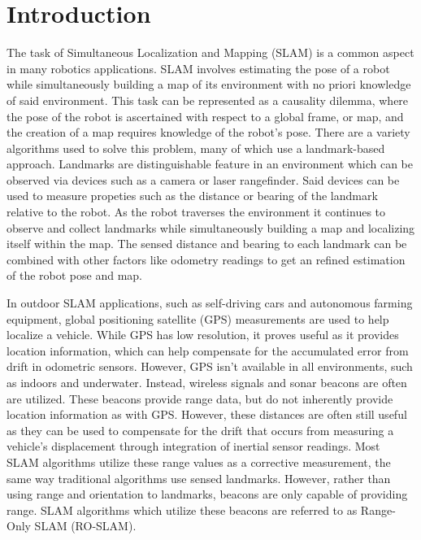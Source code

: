 \documentclass[conference]{IEEEtran}
\begin{document}
	\section{Introduction} 
	
		The task of Simultaneous Localization and Mapping (SLAM) is a common aspect in many robotics applications. SLAM involves estimating the pose of a robot while simultaneously building a map of its environment with no priori knowledge of said environment. This task can be represented as a causality dilemma, where the pose of the robot is ascertained with respect to a global frame, or map, and the creation of a map requires knowledge of the robot's pose. There are a variety algorithms used to solve this problem, many of which use a landmark-based approach. Landmarks are distinguishable feature in an environment which can be observed via devices such as a camera or laser rangefinder. Said devices can be used to measure propeties such as the distance or bearing of the landmark relative to the robot. As the robot traverses the environment it continues to observe and collect landmarks while simultaneously building a map and localizing itself within the map. The sensed distance and bearing to each landmark can be combined with other factors like odometry readings to get an refined estimation of the robot pose and map. 
		

		In outdoor SLAM applications, such as self-driving cars and autonomous farming equipment, global positioning satellite (GPS) measurements are used to help localize a vehicle. %
		While GPS has low resolution, it proves useful as it provides location information, which can help compensate for the accumulated error from drift in odometric sensors. However, GPS isn't available in all environments, such as indoors and underwater. Instead, wireless signals and sonar beacons are often are utilized. These beacons provide range data, but do not inherently provide location information as with GPS. However, these distances are often still useful as they can be used to compensate for the drift that occurs from measuring a vehicle's displacement through integration of inertial sensor readings. Most SLAM algorithms utilize these range values as a corrective measurement, the same way traditional algorithms use sensed landmarks. However, rather than using range and orientation to landmarks, beacons are only capable of providing range. SLAM algorithms which utilize these beacons are referred to as Range-Only SLAM (RO-SLAM). 
		
\end{document}
